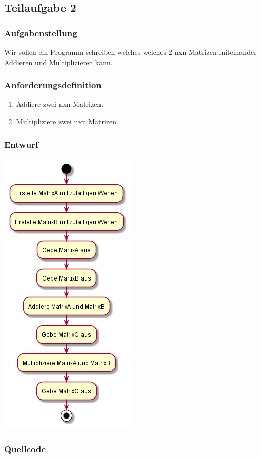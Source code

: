 \subsection{Teilaufgabe 2}
\subsubsection{Aufgabenstellung}
Wir sollen ein Programm schreiben welches welches 2 nxn Matrizen miteinander Addieren und Multiplizieren kann.

\subsubsection{Anforderungsdefinition}
\begin{enumerate}
	\item Addiere zwei nxn Matrizen.
	\item Multipliziere zwei nxn Matrizen.
\end{enumerate}

\subsubsection{Entwurf}
\includegraphics[scale=0.75]{uml/uml_c4_p2.png}

\subsubsection{Quellcode}
